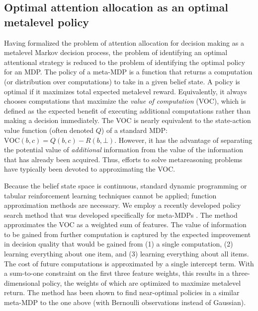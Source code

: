 \documentclass[12pt,a4paperpaper,]{article}
\begin{document}
\subsection{Optimal attention allocation as an optimal metalevel policy}
Having formalized the problem of attention allocation for decision making as a metalevel Markov decision process, the problem of identifying an optimal attentional strategy is reduced to the problem of identifying the optimal policy for an MDP. The policy of a meta-MDP is a function that returns a computation (or distribution over computations) to take in a given belief state. A policy is optimal if it maximizes total expected metalevel reward. Equivalently, it always chooses computations that maximize the \emph{value of computation} (VOC), which is defined as the expected benefit of executing additional computations rather than making a decision immediately.
The VOC is nearly equivalent to the state-action value function (often denoted $Q$) of a standard MDP: $\text{VOC}(b, c) = Q(b, c) - R(b, \bot)$. However, it has the advantage of separating the potential value of \emph{additional} information from the value of the information that has already been acquired. Thus, efforts to solve metareasoning problems have typically been devoted to approximating the VOC.

Because the belief state space is continuous, standard dynamic programming or tabular reinforcement learning techniques cannot be applied; function approximation methods are necessary. We employ a recently developed policy search method that was developed specifically for meta-MDPs \citep{callaway2018learning}. The method approximates the VOC as a weighted sum of features. The value of information to be gained from further computation is captured by the expected improvement in decision quality that would be gained from (1) a single computation, (2) learning everything about one item, and (3) learning everything about all items. The cost of future computations is approximated by a single intercept term. With a sum-to-one constraint on the first three feature weights, this results in a three-dimensional policy, the weights of which are optimized to maximize metalevel return. The method has been shown to find near-optimal policies in a similar meta-MDP to the one above (with Bernoulli observations instead of Gaussian).
\end{document}
